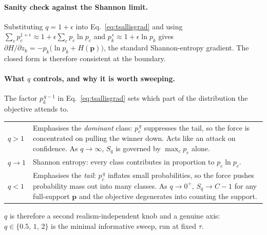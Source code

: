 \documentclass[11pt,a4paper]{article}
\begin{document}
\paragraph{Sanity check against the Shannon limit.}
Substituting $q=1+\epsilon$ into Eq.~\eqref{eq:tsallisgrad} and using
$\sum_c p_c^{1+\epsilon}\approx1+\epsilon\sum_c p_c\ln p_c$ and
$p_k^{\,\epsilon}\approx1+\epsilon\ln p_k$ gives
$\partial H/\partial z_k = -p_k\big(\ln p_k + H(\mathbf{p})\big)$, the
standard Shannon-entropy gradient. The closed form is therefore consistent
at the boundary.

\paragraph{What $q$ controls, and why it is worth sweeping.}
The factor $p_k^{\,q-1}$ in Eq.~\eqref{eq:tsallisgrad} sets which part of
the distribution the objective attends to.
\begin{center}
\small
\begin{tabular}{@{}lL{10.2cm}@{}}
\toprule
$q>1$ & Emphasises the \emph{dominant} class: $p_c^{\,q}$ suppresses the
tail, so the force is concentrated on pulling the winner down. Acts like an
attack on confidence. As $q\to\infty$, $S_q$ is governed by
$\max_c p_c$ alone. \\[3pt]
$q\to1$ & Shannon entropy: every class contributes in proportion to
$p_c\ln p_c$. \\[3pt]
$q<1$ & Emphasises the \emph{tail}: $p_c^{\,q}$ inflates small
probabilities, so the force pushes probability mass out into many classes.
As $q\to0^{+}$, $S_q\to C-1$ for any full-support $\mathbf{p}$ and the
objective degenerates into counting the support. \\
\bottomrule
\end{tabular}
\end{center}
$q$ is therefore a second realism-independent knob and a genuine axis:
$q\in\{0.5,\,1,\,2\}$ is the minimal informative sweep, run at fixed $\tau$.
\end{document}
